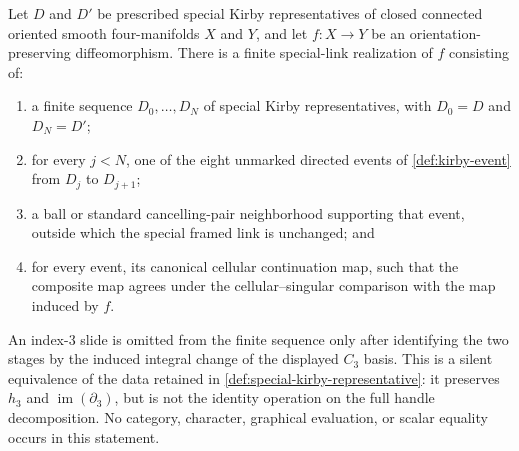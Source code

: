 \begin{proposition}
\label{prop:exact-special-link-realization}
Let $D$ and $D'$ be prescribed special Kirby representatives of closed
connected oriented smooth four-manifolds $X$ and $Y$, and let
$f\colon X\to Y$ be an orientation-preserving diffeomorphism.  There is a
finite special-link realization of $f$ consisting of:
\begin{enumerate}[label=(\roman*),ref=\roman*]
  \item a finite sequence $D_0,\ldots,D_N$ of special Kirby
  representatives, with $D_0=D$ and $D_N=D'$;

  \item for every $j<N$, one of the eight unmarked directed events of
  \cref{def:kirby-event} from $D_j$ to $D_{j+1}$;

  \item a ball or standard cancelling-pair neighborhood supporting that
  event, outside which the special framed link is unchanged; and

  \item for every event, its canonical cellular continuation map, such that
  the composite map agrees under the cellular--singular comparison with the
  map induced by $f$.
\end{enumerate}
An index-$3$ slide is omitted from the finite sequence only after identifying
the two stages by the induced integral change of the displayed $C_3$ basis.
This is a silent equivalence of the data retained in
\cref{def:special-kirby-representative}: it preserves $h_3$ and
$\operatorname{im}(\partial_3)$, but is not the identity operation on the
full handle decomposition.  No category, character, graphical evaluation,
or scalar equality occurs in this statement.
\end{proposition}

